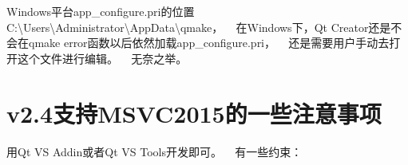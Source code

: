 Windows平台app\+\_\+configure.\+pri的位置 C\+:\textbackslash{}Users\textbackslash{}Administrator\textbackslash{}App\+Data\textbackslash{}qmake， ~\newline
在\+Windows下，\+Qt Creator还是不会在qmake error函数以后依然加载app\+\_\+configure.\+pri， ~\newline
还是需要用户手动去打开这个文件进行编辑。 ~\newline
无奈之举。 ~\newline
  ~\newline
 \section*{v2.\+4支持\+M\+S\+V\+C2015的一些注意事项}

用\+Qt VS Addin或者\+Qt VS Tools开发即可。 ~\newline
 有一些约束：
